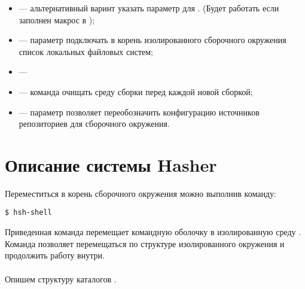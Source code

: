 \begin{itemize}
	\item {} --- альтернативный варинт указать параметр  для .
	(Будет работать если заполнен макрос   в );
	\item {} --- параметр подключать в корень изолированного сборочного
	окружения список локальных файловых систем;
	\item {} ---
	\item {} --- команда очищать среду сборки перед каждой новой сборкой;
	\item {} --- параметр позволяет переобозначить конфигурацию источников
	репозиториев для сборочного окружения.
\end{itemize}

\section{Описание системы Hasher}
Переместиться в корень сборочного окружения можно выполнив команду:
\begin{verbatim}
$ hsh-shell
\end{verbatim}
Приведенная команда перемещает командную оболочку в изолированную среду .
Команда позволяет перемещаться по структуре изолированного окружения и продолжить работу
внутри.\\
\\
Опишем структуру каталогов .

